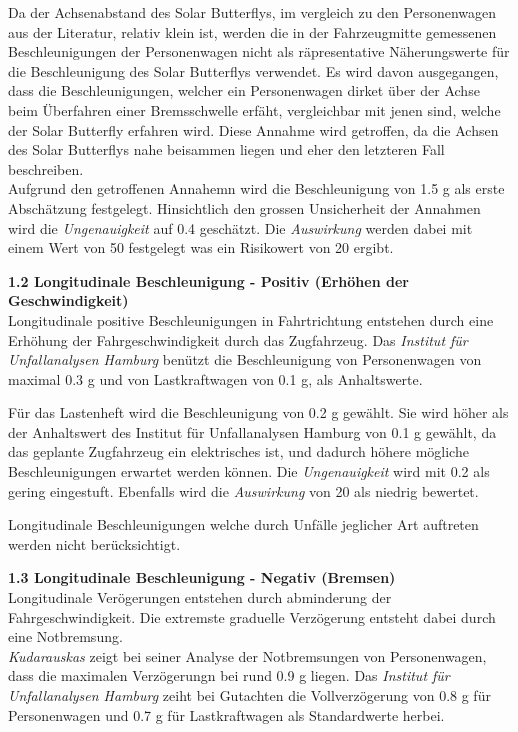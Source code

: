 \begin{description}
    Da der Achsenabstand des Solar Butterflys, im vergleich zu den Personenwagen aus der Literatur, relativ klein ist, werden die in der Fahrzeugmitte gemessenen Beschleunigungen der Personenwagen nicht als räpresentative Näherungswerte für die Beschleunigung des Solar Butterflys verwendet. Es wird davon ausgegangen, dass die Beschleunigungen, welcher ein Personenwagen dirket über der Achse beim Überfahren einer Bremsschwelle erfäht, vergleichbar mit jenen sind, welche der Solar Butterfly erfahren wird. Diese Annahme wird getroffen, da die Achsen des Solar Butterflys nahe beisammen liegen und eher den letzteren Fall beschreiben.\\
    Aufgrund den getroffenen Annahemn wird die Beschleunigung von 1.5 g als erste Abschätzung festgelegt. Hinsichtlich den grossen Unsicherheit der Annahmen wird die \emph{Ungenauigkeit} auf 0.4 geschätzt. Die \emph{Auswirkung} werden dabei mit einem Wert von 50 festgelegt was ein Risikowert von 20 ergibt.

    \item \textbf{1.2 Longitudinale Beschleunigung - Positiv (Erhöhen der Geschwindigkeit)}\\
    Longitudinale positive Beschleunigungen in Fahrtrichtung entstehen durch eine Erhöhung der Fahrgeschwindigkeit durch das Zugfahrzeug. Das \emph{Institut für Unfallanalysen Hamburg} \cite{Verz.3} benützt die Beschleunigung von Personenwagen von maximal 0.3 g und von Lastkraftwagen von 0.1 g, als Anhaltswerte.

    Für das Lastenheft wird die Beschleunigung von 0.2 g gewählt. Sie wird höher als der Anhaltswert des Institut für Unfallanalysen Hamburg von 0.1 g gewählt, da das geplante Zugfahrzeug ein elektrisches ist, und dadurch höhere mögliche Beschleunigungen erwartet werden können. Die \emph{Ungenauigkeit} wird mit 0.2 als gering eingestuft. Ebenfalls wird die \emph{Auswirkung} von 20 als niedrig bewertet.

    Longitudinale Beschleunigungen welche durch Unfälle jeglicher Art auftreten werden nicht berücksichtigt.

    \item \textbf{1.3 Longitudinale Beschleunigung - Negativ (Bremsen)}\\
    Longitudinale Verögerungen entstehen durch abminderung der Fahrgeschwindigkeit. Die extremste graduelle Verzögerung entsteht dabei durch eine Notbremsung.\\
    \emph{Kudarauskas} \cite{Verz.1} zeigt bei seiner Analyse der Notbremsungen von Personenwagen, dass die maximalen Verzögerungn bei rund 0.9 g liegen. Das \emph{Institut für Unfallanalysen Hamburg} \cite{Verz.2} zeiht bei Gutachten die Vollverzögerung von 0.8 g für Personenwagen und 0.7 g für Lastkraftwagen als Standardwerte herbei.


\end{description}
